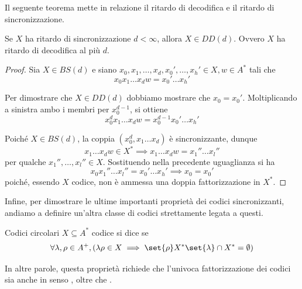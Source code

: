 Il seguente teorema mette in relazione il ritardo di decodifica e il ritardo di sincronizzazione.
\begin{theorem}{}
  Se \(X\) ha ritardo di sincronizzazione \(d < \infty\), allora \(X \in DD(d)\).
  Ovvero \(X\) ha ritardo di decodifica al più \(d\).
\end{theorem}

\begin{proof}
  Sia \(X\in BS(d)\) e siano \(x_0,x_1,\ldots,x_d,x_0',\ldots,x_h' \in X, w \in A^*\) tali che
  \[x_0x_1\ldots x_d w = x_0'\ldots x_h'\]

  Per dimostrare che \(X \in DD(d)\) dobbiamo mostrare che \(x_0 = x_0'\).
  Moltiplicando a sinistra ambo i membri per $x_{0}^{d-1}$, si ottiene
  \[x_0^d x_1\ldots x_d w = x_0^{d-1}x_0'\ldots x_h'\]

  Poiché \(X \in BS(d)\), la coppia \((x_0^d, x_1\ldots x_d)\) è sincronizzante, dunque
  \[x_1\ldots x_d w \in X^* \implies x_1\ldots x_d w = x_1''\ldots x_l''\]
  per qualche \(x_1'',\ldots, x_l'' \in X\).
  Sostituendo nella precedente uguaglianza si ha
  \[x_0x_1''\ldots x_l'' = x_0'\ldots x_h' \implies x_0 = x_0'\]
  poiché, essendo \(X\) codice, non è ammessa una doppia fattorizzazione in $X^{*}$.
\end{proof}

Infine, per dimostrare le ultime importanti proprietà dei codici sincronizzanti, andiamo a definire un'altra classe di codici strettamente legata a questi.

\begin{definition}{Codici circolari}
  \(X \subseteq A^*\) codice si dice  se
  \[\forall \lambda, \rho \in A^+, (\lambda \rho \in X\implies \set{\rho}X^*\set{\lambda} \cap X^* = \emptyset)\]
\end{definition}

In altre parole, questa proprietà richiede che l'univoca fattorizzazione dei codici sia anche in senso , oltre che .

